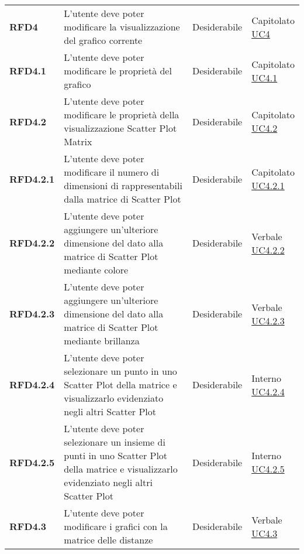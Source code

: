 \begin{longtable}[H]{| >{\raggedright\bfseries}m{20mm} | >{\raggedright}m{90mm} | >{\centering}m{25mm} | >{\centering\arraybackslash}m{30mm}|}
    RFD4
    & L'utente deve poter modificare la visualizzazione del grafico corrente
    & Desiderabile
    & \makecell{ Capitolato \\ \hyperref[sub:uc4]{UC4} }\\

    RFD4.1
    & L'utente deve poter modificare le proprietà del grafico
    & Desiderabile
    & \makecell{ Capitolato \\ \hyperref[ssub:uc4.1]{UC4.1} }\\

    RFD4.2
    & L'utente deve poter modificare le proprietà della visualizzazione Scatter Plot Matrix
    & Desiderabile
    & \makecell{ Capitolato \\ \hyperref[ssub:uc4.2]{UC4.2} }\\

    RFD4.2.1
    & L'utente deve poter modificare il numero di dimensioni di rappresentabili dalla matrice di Scatter Plot
    & Desiderabile
    & \makecell{ Capitolato \\ \hyperref[par:uc4.2.1]{UC4.2.1} }\\

    RFD4.2.2
    & L'utente deve poter aggiungere un'ulteriore dimensione del dato alla matrice di Scatter Plot mediante colore
    & Desiderabile
    & \makecell{ Verbale \\ \hyperref[par:uc4.2.2]{UC4.2.2} }\\

    RFD4.2.3
    & L'utente deve poter aggiungere un'ulteriore dimensione del dato alla matrice di Scatter Plot mediante brillanza
    & Desiderabile
    & \makecell{ Verbale \\ \hyperref[par:uc4.2.3]{UC4.2.3} }\\

    RFD4.2.4
    & L'utente deve poter selezionare un punto in uno Scatter Plot della matrice e visualizzarlo evidenziato negli
    altri Scatter Plot
    & Desiderabile
    & \makecell{ Interno \\ \hyperref[par:uc4.2.4]{UC4.2.4} }\\

    RFD4.2.5
    & L'utente deve poter selezionare un insieme di punti in uno Scatter Plot della matrice e visualizzarlo evidenziato
    negli altri Scatter Plot
    & Desiderabile
    & \makecell{ Interno \\ \hyperref[par:uc4.2.5]{UC4.2.5} }\\

    RFD4.3
    & L'utente deve poter modificare i grafici con la matrice delle distanze
    & Desiderabile
    & \makecell{ Verbale \\ \hyperref[ssub:uc4.3]{UC4.3} }\\


\end{longtable}
